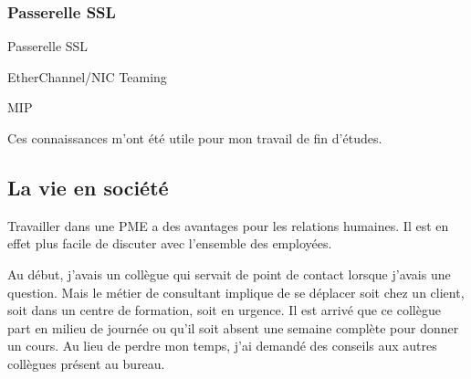 \subsubsection{Passerelle SSL}
Passerelle SSL 



EtherChannel/NIC Teaming

MIP


Ces connaissances m'ont été utile pour mon travail de fin d'études. 
\subsection{La vie en société}
Travailler dans une PME a des avantages pour les relations humaines.
Il est en effet plus facile de discuter avec l'ensemble des employées.

Au début, j'avais un collègue qui servait de point de contact lorsque j'avais une question.
Mais le métier de consultant implique de se déplacer soit chez un client, soit dans un centre de formation, soit en urgence.
Il est arrivé que ce collègue part en milieu de journée ou qu'il soit absent une semaine complète pour donner un cours.
Au lieu de perdre mon temps, j'ai demandé des conseils aux autres collègues présent au bureau. 

